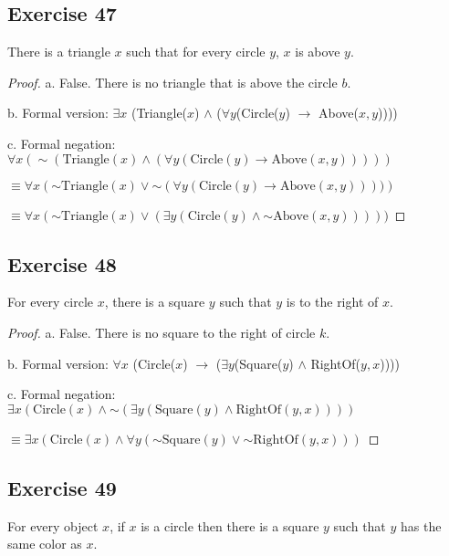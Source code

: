 \documentclass[14pt]{extarticle}
\newcommand{\fa}{\forall}
\newcommand{\te}{\exists}
\begin{document}
\subsection{Exercise 47}
There is a triangle $x$ such that for every circle $y$, $x$ is above $y$.

\begin{proof}
    a. False. There is no triangle that is above the circle $b$.

    b. Formal version: $\te x$ (Triangle($x$) $\wedge$ ($\fa y$(Circle($y$) $\to$ Above($x, y$))))

    c. Formal negation: $\fa x({\sim (\text{Triangle}(x) \wedge (\fa y(\text{Circle}(y) \to \text{Above}(x, y))))})$

    $\equiv \fa x ({\sim \text{Triangle}(x)} \vee {\sim(\fa y(\text{Circle}(y) \to \text{Above}(x, y))))})$

    $\equiv \fa x ({\sim \text{Triangle}(x)} \vee (\te y(\text{Circle}(y) \wedge {\sim \text{Above}(x, y)}))))$
\end{proof}

\subsection{Exercise 48}
For every circle $x$, there is a square $y$ such that $y$ is to the right of $x$.

\begin{proof}
    a. False. There is no square to the right of circle $k$.

    b. Formal version: $\fa x$ (Circle($x$) $\to$ ($\te y$(Square($y$) $\wedge$ RightOf($y, x$))))

    c. Formal negation: $\te x(\text{Circle}(x) \wedge {\sim (\te y(\text{Square}(y) \wedge \text{RightOf}(y, x)))})$

    $\equiv \te x(\text{Circle}(x) \wedge \fa y({\sim \text{Square}(y)} \vee {\sim\text{RightOf}(y, x)}))$
\end{proof}

\subsection{Exercise 49}
For every object $x$, if $x$ is a circle then there is a square $y$ such that $y$ has the same color as $x$.
\end{document}

